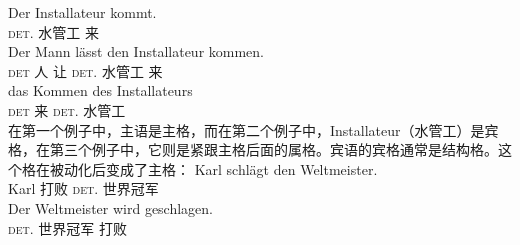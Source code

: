 \eal
\ex 
\gll Der Installateur kommt.\\
	 \textsc{det}.\nom{} 水管工 来\\
\ex 
\gll Der Mann lässt den Installateur kommen.\\
	 \textsc{det} 人 让 \textsc{det}.\acc{} 水管工 来\\
\ex 
\gll das Kommen des Installateurs\\
	 \textsc{det} 来 \textsc{det}.\gen{} 水管工\\
\zl
在第一个例子中，主语是主格，而在第二个例子中，Installateur（水管工）是宾格，在第三个例子中，它则是紧跟主格后面的属格。宾语的宾格通常是结构格。这个格在被动化后变成了主格：
\eal
\ex 
\gll Karl schlägt den Weltmeister.\\
     Karl 打败 \textsc{det}.\acc{} 世界冠军\\
\ex 
\gll Der Weltmeister wird geschlagen.\\
     \textsc{det}.\nom{} 世界冠军 \passiveprs{} 打败\\
\zl

